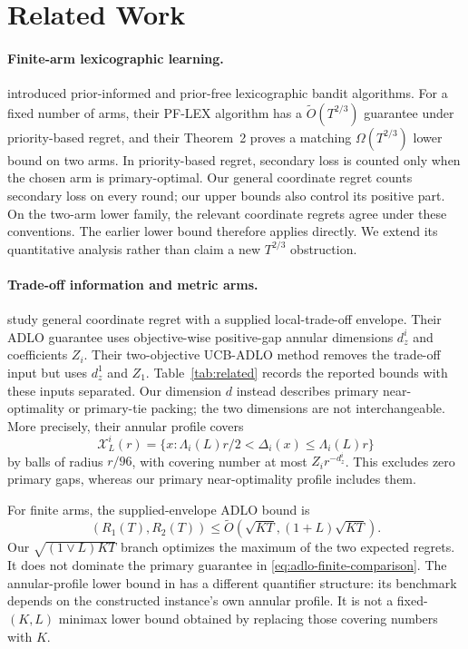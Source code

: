 \documentclass[11pt]{article}
\theoremstyle{definition}
\newcommand{\X}{\mathcal X}
\begin{document}
\section{Related Work}
\label{sec:related}

\paragraph{Finite-arm lexicographic learning.}
\citet{huyuk2021lexicographic} introduced prior-informed and prior-free
lexicographic bandit algorithms. For a fixed number of arms, their
PF-LEX algorithm has a $\widetilde O(T^{2/3})$ guarantee under
priority-based regret, and their Theorem~2 proves a matching
$\Omega(T^{2/3})$ lower bound on two arms. In priority-based regret,
secondary loss is counted only when the chosen arm is primary-optimal.
Our general coordinate regret counts secondary loss on every round;
our upper bounds also control its positive part. On the two-arm lower
family, the relevant coordinate regrets agree under these conventions.
The earlier lower bound therefore applies directly. We extend its
quantitative analysis rather than claim a new $T^{2/3}$ obstruction.

\paragraph{Trade-off information and metric arms.}
\citet{xue2024lipschitz,xue2025jmlr} study general coordinate regret
with a supplied local-trade-off envelope. Their ADLO guarantee uses
objective-wise positive-gap annular dimensions $d_z^i$ and coefficients
$Z_i$. Their two-objective UCB-ADLO method removes the trade-off input
but uses $d_z^1$ and $Z_1$. Table~\ref{tab:related} records the reported
bounds with these inputs separated. Our dimension $d$ instead describes
primary near-optimality or primary-tie packing; the two dimensions are
not interchangeable. More precisely, their annular profile covers
\[
 \X_L^i(r)=\{x:\Lambda_i(L)r/2<\Delta_i(x)\le\Lambda_i(L)r\}
\]
by balls of radius $r/96$, with covering number at most
$Z_i r^{-d_z^i}$. This excludes zero primary gaps, whereas our
primary near-optimality profile includes them.

For finite arms, the supplied-envelope ADLO bound is
\begin{equation}
\label{eq:adlo-finite-comparison}
 (R_1(T),R_2(T))
 \le \widetilde O\!\left(\sqrt{KT},(1+L)\sqrt{KT}\right).
\end{equation}
Our $\sqrt{(1\vee L)KT}$ branch optimizes the maximum of the two
expected regrets. It does not dominate the primary guarantee in
\eqref{eq:adlo-finite-comparison}. The annular-profile lower bound in
\citet[Theorem~3]{xue2025jmlr} has a different quantifier structure:
its benchmark depends on the constructed instance's own annular
profile. It is not a fixed-$(K,L)$ minimax lower bound obtained by
replacing those covering numbers with $K$.
\end{document}
